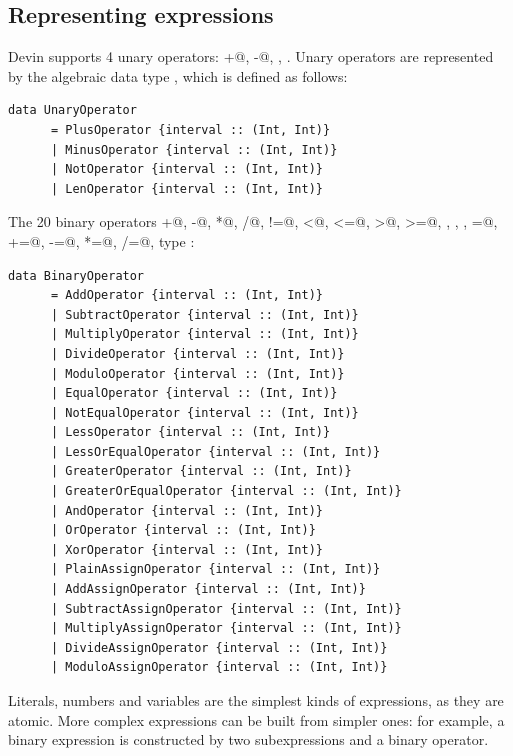 \documentclass[UdineBachThesis,american,11pt,draft]{PhdThesis}
\begin{document}
  \subsection{Representing expressions}

  Devin supports 4 unary operators: \lstinline@+@, \lstinline@-@,
  \lstinline@not@, \lstinline@len@. Unary operators are represented by the
  algebraic data type \lstinline@UnaryOperator@, which is defined as follows:\

  \begin{lstlisting}[gobble=4,basicstyle=\ttfamily\small]
    data UnaryOperator
      = PlusOperator {interval :: (Int, Int)}
      | MinusOperator {interval :: (Int, Int)}
      | NotOperator {interval :: (Int, Int)}
      | LenOperator {interval :: (Int, Int)}
  \end{lstlisting}

  The 20 binary operators \lstinline@+@, \lstinline@-@, \lstinline@*@,
  \lstinline@/@, \lstinline@%@, \lstinline@==@,
  \lstinline@!=@, \lstinline@<@, \lstinline@<=@, \lstinline@>@, \lstinline@>=@,
  \lstinline@and@, \lstinline@or@, \lstinline@xor@, \lstinline@=@,
  \lstinline@+=@, \lstinline@-=@, \lstinline@*=@, \lstinline@/=@,
  \lstinline@%=@ are represented by the
  type \lstinline@BinaryOperator@:

  \begin{lstlisting}[gobble=4,basicstyle=\ttfamily\small]
    data BinaryOperator
      = AddOperator {interval :: (Int, Int)}
      | SubtractOperator {interval :: (Int, Int)}
      | MultiplyOperator {interval :: (Int, Int)}
      | DivideOperator {interval :: (Int, Int)}
      | ModuloOperator {interval :: (Int, Int)}
      | EqualOperator {interval :: (Int, Int)}
      | NotEqualOperator {interval :: (Int, Int)}
      | LessOperator {interval :: (Int, Int)}
      | LessOrEqualOperator {interval :: (Int, Int)}
      | GreaterOperator {interval :: (Int, Int)}
      | GreaterOrEqualOperator {interval :: (Int, Int)}
      | AndOperator {interval :: (Int, Int)}
      | OrOperator {interval :: (Int, Int)}
      | XorOperator {interval :: (Int, Int)}
      | PlainAssignOperator {interval :: (Int, Int)}
      | AddAssignOperator {interval :: (Int, Int)}
      | SubtractAssignOperator {interval :: (Int, Int)}
      | MultiplyAssignOperator {interval :: (Int, Int)}
      | DivideAssignOperator {interval :: (Int, Int)}
      | ModuloAssignOperator {interval :: (Int, Int)}
  \end{lstlisting}

  Literals, numbers and variables are the simplest kinds of expressions, as they
  are atomic. More complex expressions can be built from simpler ones: for
  example, a binary expression is constructed by two subexpressions and a binary
  operator.
\end{document}
